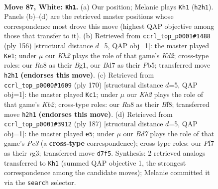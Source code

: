 \documentclass[11pt]{article}
\begin{document}
\clearpage

\begin{figure}[p]\centering
\begin{subfigure}{0.46\textwidth}\centering
\resizebox{\linewidth}{!}{%
\newchessgame
\chessboard[
  setfen={R7/3B1P2/8/7P/8/1k6/7K/8 w - - 5 87},
  showmover=false,
  pgfstyle=straightmove, color=movearrow, markmove={h2-h1}
]}
\caption{}
\end{subfigure}\hfill
\begin{subfigure}{0.46\textwidth}\centering
\resizebox{\linewidth}{!}{%
\newchessgame
\chessboard[
  setfen={8/8/5p2/1P1k3b/8/8/3K4/6B1 w - - 1 79},
  showmover=false,
  pgfstyle=straightmove, color=movearrow, markmove={d2-e1}
]}
\caption{}
\end{subfigure}
\\[4pt]
\begin{subfigure}{0.46\textwidth}\centering
\resizebox{\linewidth}{!}{%
\newchessgame
\chessboard[
  setfen={5B2/3k4/6b1/6P1/8/8/1K6/8 w - - 3 86},
  showmover=false,
  pgfstyle=straightmove, color=movearrow, markmove={b2-c1}
]}
\caption{}
\end{subfigure}\hfill
\begin{subfigure}{0.46\textwidth}\centering
\resizebox{\linewidth}{!}{%
\newchessgame
\chessboard[
  setfen={8/8/2k1p3/8/5P2/6R1/3K4/1r6 b - - 16 94},
  showmover=false,
  pgfstyle=straightmove, color=movearrow, markmove={e6-e5}
]}
\caption{}
\end{subfigure}
\caption{\textbf{Move 87, White: \texttt{Kh1}.} (a) Our position; Melanie plays \texttt{Kh1} (\texttt{h2h1}). Panels (b)--(d) are the retrieved master positions whose correspondence most drove this move (highest QAP objective among those that transfer to it). (b) Retrieved from \texttt{ccrl\_top\_p0001\#1488} (ply 156) [structural distance $d$=5, QAP obj=1]: the master played \texttt{Ke1}; under $\mu$ our \emph{Kh2} plays the role of that game's \emph{Kd2}; cross-type roles: our \emph{R}a8 as their \emph{B}g1, our \emph{B}d7 as their \emph{P}b5; transferred move \texttt{h2h1} \textbf{(endorses this move)}. (c) Retrieved from \texttt{ccrl\_top\_p0000\#1609} (ply 170) [structural distance $d$=5, QAP obj=1]: the master played \texttt{Kc1}; under $\mu$ our \emph{Kh2} plays the role of that game's \emph{Kb2}; cross-type roles: our \emph{R}a8 as their \emph{B}f8; transferred move \texttt{h2h1} \textbf{(endorses this move)}. (d) Retrieved from \texttt{ccrl\_top\_p0001\#3912} (ply 187) [structural distance $d$=5, QAP obj=1]: the master played \texttt{e5}; under $\mu$ our \emph{Bd7} plays the role of that game's \emph{Pe3} (a \textbf{cross-type} correspondence); cross-type roles: our \emph{P}f7 as their \emph{r}g3; transferred move \texttt{d7f5}. Synthesis: 2 retrieved analogs transferred to \texttt{Kh1} (summed QAP objective 1, the strongest correspondence among the candidate moves); Melanie committed it via the \texttt{search} selector.}
\label{fig:thought-m172}
\end{figure}
\end{document}
